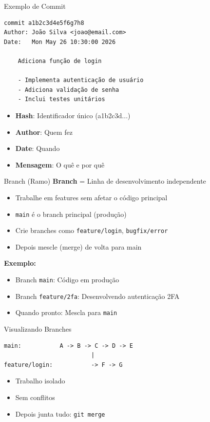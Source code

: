 \documentclass[11pt]{beamer}
\begin{document}
\begin{frame}{Exemplo de Commit}
\begin{lstlisting}
commit a1b2c3d4e5f6g7h8
Author: João Silva <joao@email.com>
Date:   Mon May 26 10:30:00 2026

    Adiciona função de login
    
    - Implementa autenticação de usuário
    - Adiciona validação de senha
    - Inclui testes unitários
\end{lstlisting}

\begin{itemize}
    \small
    \item \textbf{Hash}: Identificador único (a1b2c3d...)
    \item \textbf{Author}: Quem fez
    \item \textbf{Date}: Quando
    \item \textbf{Mensagem}: O quê e por quê
\end{itemize}
\end{frame}

\begin{frame}{Branch (Ramo)}
\textbf{Branch} = Linha de desenvolvimento independente

\begin{itemize}
    \item Trabalhe em features sem afetar o código principal
    \item \texttt{main} é o branch principal (produção)
    \item Crie branches como \texttt{feature/login}, \texttt{bugfix/error}
    \item Depois mescle (merge) de volta para main
\end{itemize}

\vspace{0.3cm}

\textbf{Exemplo:}
\begin{itemize}
    \small
    \item Branch \texttt{main}: Código em produção
    \item Branch \texttt{feature/2fa}: Desenvolvendo autenticação 2FA
    \item Quando pronto: Mescla para \texttt{main}
\end{itemize}
\end{frame}

\begin{frame}{Visualizando Branches}
\begin{lstlisting}
main:           A -> B -> C -> D -> E
                         |
feature/login:           -> F -> G
\end{lstlisting}

\begin{itemize}
    \item Trabalho isolado
    \item Sem conflitos
    \item Depois junta tudo: \texttt{git merge}
\end{itemize}
\end{frame}
\end{document}
